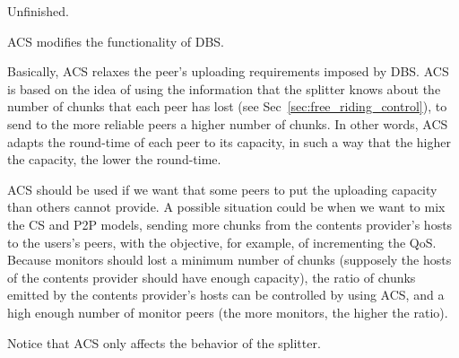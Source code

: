 
\label{sec:ACS}

\begin{note}
  Unfinished.
\end{note}

ACS modifies the functionality of DBS.

Basically, ACS relaxes the peer's uploading requirements imposed by
DBS. ACS is based on the idea of using the information that the
splitter knows about the number of chunks that each peer has lost (see
Sec~\ref{sec:free_riding_control}), to send to the more reliable peers
a higher number of chunks. In other words, ACS adapts the round-time
of each peer to its capacity, in such a way that the higher the
capacity, the lower the round-time.

ACS should be used if we want that some peers to put the uploading
capacity than others cannot provide. A possible situation could be
when we want to mix the CS and P2P models, sending more chunks from
the contents provider's hosts to the users's peers, with the
objective, for example, of incrementing the QoS. Because monitors
should lost a minimum number of chunks (supposely the hosts of the
contents provider should have enough capacity), the ratio of chunks
emitted by the contents provider's hosts can be controlled by using
ACS, and a high enough number of monitor peers (the more monitors, the
higher the ratio).

Notice that ACS only affects the behavior of the splitter.

